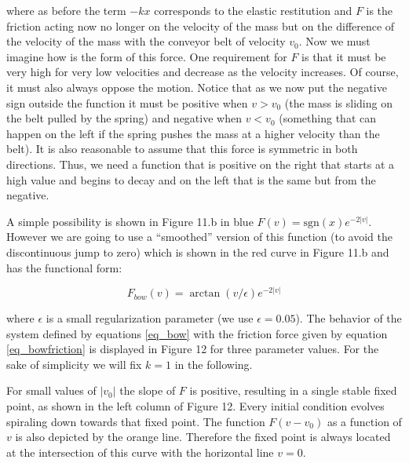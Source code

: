 \documentclass{article}
\begin{document}
where as before the term $-kx$ corresponds to the elastic restitution and $F$ is the friction acting now no longer on the velocity of the mass but on the difference of the velocity of the mass with the conveyor belt of velocity $v_0$. 
Now we must imagine how is the form of this force. 
One requirement for $F$ is that it must be very high for very low velocities and decrease as the velocity increases. 
Of course, it must also always oppose the motion. 
Notice that as we now put the negative sign outside the function it must be positive when $v>v_0$ (the mass is sliding on the belt pulled by the spring) and negative when $v<v_0$ (something that can happen on the left if the spring pushes the mass at a higher velocity than the belt). 
It is also reasonable to assume that this force is symmetric in both directions. 
Thus, we need a function that is positive on the right that starts at a high value and begins to decay and on the left that is the same but from the negative. 

A simple possibility is shown in Figure 11.b in blue $F(v) = \text{sgn}(x) e^{-2|v|}$. 
However we are going to use a “smoothed” version of this function (to avoid the discontinuous jump to zero) which is shown in the red curve in Figure 11.b and has the functional form:

\begin{equation} \label{eq_bowfriction}
    F_{bow}(v) = \arctan(v/\epsilon) e^{-2|v|} 
\end{equation}

where $\epsilon$ is a small regularization parameter (we use $\epsilon = 0.05$).
The behavior of the system defined by equations \ref{eq_bow} with the friction force given by equation \ref{eq_bowfriction} is displayed in Figure 12 for three parameter values. 
For the sake of simplicity we will fix $k=1$ in the following.

For small values of $|v_0|$ the slope of $F$ is positive, resulting in a single stable fixed point, as shown in the left column of Figure 12.
Every initial condition evolves spiraling down towards that fixed point. 
The function $F(v-v_0)$ as a function of $v$ is also depicted by the 
orange line. Therefore the fixed point is always located at the intersection of this curve with the horizontal line $v=0$.
\end{document}
